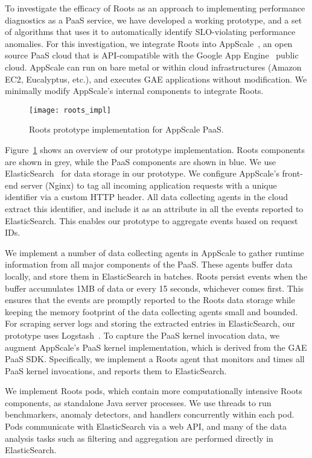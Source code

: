 To investigate the efficacy of Roots as an approach to
implementing performance diagnostics as a PaaS service, we have developed a
working prototype, and a set of algorithms that uses it to automatically
identify SLO-violating performance anomalies.
For this investigation, we integrate Roots into AppScale~\cite{6488671}, an open source PaaS cloud
that is API-compatible with the Google App Engine~\cite{gae} public cloud.  
AppScale can run on bare metal or within cloud infrastructures (Amazon EC2, Eucalyptus, 
etc.), and executes GAE applications without modification.
We minimally modify AppScale's internal components to integrate Roots.

\begin{figure}
\centering
\texttt{[image: roots\_impl]}
\caption{Roots prototype implementation for AppScale PaaS.}
\label{fig:roots_impl}
\end{figure}

Figure~\ref{fig:roots_impl} shows an overview of our prototype implementation. Roots components
are shown in grey, while the PaaS components are shown in blue.
We use ElasticSearch~\cite{Kononenko:2014:MMR:2597073.2597091} for data storage in our prototype. 
We configure AppScale's front-end server (Nginx) to tag all incoming application requests
with a unique identifier via a custom HTTP header. 
All data collecting agents in the cloud extract this identifier, and include it as an attribute
in all the events reported to ElasticSearch. This enables our prototype to aggregate events based 
on request IDs.

We implement a number of data collecting agents in AppScale to gather runtime information
from all major components of the PaaS. These agents buffer data locally, and store them in ElasticSearch
in batches. Roots persist events when the buffer accumulates 1MB of data or every 15 seconds, whichever comes
first.  This ensures that the events are promptly reported to the Roots data
storage while keeping the memory footprint of the data collecting agents small and bounded. 
For scraping server logs and storing the extracted entries in ElasticSearch,
our prototype uses Logstash~\cite{logstash}. 
To capture the PaaS kernel invocation data, we augment AppScale's PaaS kernel implementation,
which is derived from the GAE PaaS SDK. Specifically, we implement a Roots agent that monitors
and times all PaaS kernel invocations, and reports them to ElasticSearch. 

We implement Roots pods, which contain more computationally intensive Roots components, 
as standalone Java server processes. We use threads to run benchmarkers,
anomaly detectors, and handlers concurrently within each pod. Pods communicate with ElasticSearch via
a web API, and many of the data analysis tasks such as filtering and aggregation are performed
directly in ElasticSearch.

